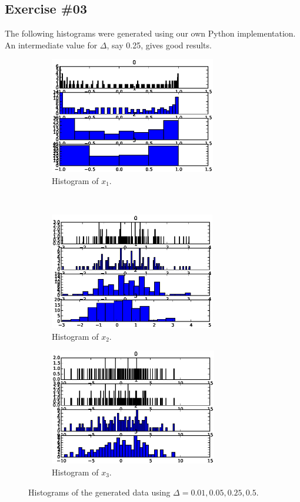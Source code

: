 \documentclass[a4paper,12pt]{article}
\begin{document}
\cleardoublepage
\subsection*{Exercise \#03}
The following histograms were generated using our own Python implementation. An intermediate value for $\Delta$, say 0.25, gives good results.
\begin{figure}[h]
    \centering
    \begin{subfigure}[t]{0.5\textwidth} 
        \centering
        \includegraphics[height=2in]{figures/e3_hist_x1.eps}
        \caption{Histogram of $x_1$.}
        \label{fig:e21}
    \end{subfigure}%
    ~  %
    \begin{subfigure}[t]{0.5\textwidth}
        \centering
        \includegraphics[height=2in]{figures/e3_hist_x2.eps}
        \caption{Histogram of $x_2$.}
        \label{fig:e22}
    \end{subfigure}%
     
    \begin{subfigure}[t]{0.5\textwidth}
        \centering
        \includegraphics[height=2in]{figures/e3_hist_x3.eps}
        \caption{Histogram of $x_3$.}
        \label{fig:e23}
    \end{subfigure}    
    \caption{Histograms of the generated data using $\Delta=0.01, 0.05, 0.25, 0.5$.}
    \label{fig:hist}
\end{figure}
\end{document}
